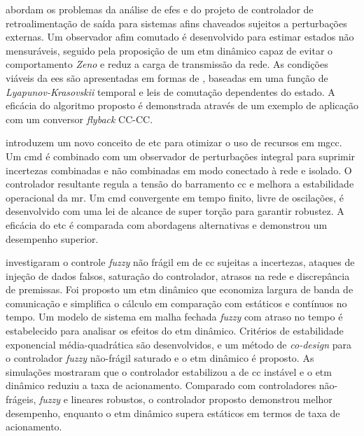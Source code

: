 \cite{Xie2023} abordam os problemas da análise de \acrshort{efes} e do projeto de controlador de retroalimentação de saída para sistemas afins chaveados sujeitos a perturbações externas. Um observador afim comutado é desenvolvido para estimar estados não mensuráveis, seguido pela proposição de um \acrshort{etm} dinâmico capaz de evitar o comportamento \textit{Zeno} e reduz a carga de transmissão da rede. As condições viáveis da \acrshort{ees} são apresentadas em formas de , baseadas em uma função de \textit{\textit{Lyapunov}-Krasovskii} temporal e leis de comutação dependentes do estado. A eficácia do algoritmo proposto é demonstrada através de um exemplo de aplicação com um conversor \textit{flyback} CC-CC.

\cite{Kumar2020} introduzem um novo conceito de \acrshort{etc} para otimizar o uso de recursos em \acrshort{mgcc}. Um \acrfull{cmd} é combinado com um observador de perturbações integral para suprimir incertezas combinadas e não combinadas em modo conectado à rede e isolado. O controlador resultante regula a tensão do barramento \acrshort{cc} e melhora a estabilidade operacional da \acrshort{mr}. Um \acrshort{cmd} convergente em tempo finito, livre de oscilações, é desenvolvido com uma lei de alcance de super torção para garantir robustez. A eficácia do \acrshort{etc} é comparada com abordagens alternativas e demonstrou um desempenho superior.

\cite{Li2023} investigaram o controle \textit{fuzzy} não frágil em  de \acrshort{cc} sujeitas a incertezas, ataques de injeção de dados falsos, saturação do controlador, atrasos na rede e discrepância de premissas. Foi proposto um \acrshort{etm} dinâmico que economiza largura de banda de comunicação e simplifica o cálculo em comparação com  estáticos e contínuos no tempo. Um modelo de sistema em malha fechada \textit{fuzzy} com atraso no tempo é estabelecido para analisar os efeitos do \acrshort{etm} dinâmico. Critérios de estabilidade exponencial média-quadrática são desenvolvidos, e um método de \textit{co-design} para o controlador \textit{fuzzy} não-frágil saturado e o \acrshort{etm} dinâmico é proposto. As simulações mostraram que o controlador estabilizou a  de \acrshort{cc} instável e o \acrshort{etm} dinâmico reduziu a taxa de acionamento. Comparado com controladores não-frágeis, \textit{fuzzy} e lineares robustos, o controlador proposto demonstrou melhor desempenho, enquanto o \acrshort{etm} dinâmico supera  estáticos em termos de taxa de acionamento.

